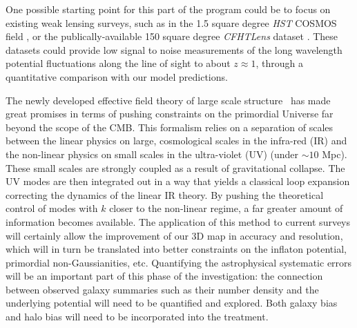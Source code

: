 \documentclass[psfig,12pt]{article}
\def\ni{\noindent}
\def\lo{\mathrel{\raise.3ex\hbox{$<$}\mkern-14mu\lower0.6ex\hbox{$\sim$}}}
\begin{document}
{One possible starting point for this part of the program could be to
focus on existing weak lensing surveys, such as in the 1.5 square degree
{\it HST} COSMOS field \cite{MasseyEtal2007}, or the
publically-available 150 square degree {\it CFHTLens} dataset
\cite{HeymansEtal2012}. These datasets could provide
low signal to noise measurements of the long wavelength potential
fluctuations along the line of sight to about $z \approx 1$,
through  a quantitative comparison with our model predictions.

\ni{\bf Further Constraints on Inflation:}
The newly developed effective field theory of large scale
structure~\cite{Carrasco2012} has made great promises in terms of
pushing constraints on the primordial Universe far beyond the scope of
the CMB. This formalism relies on a separation of scales between the
linear physics on large, cosmological scales in the infra-red (IR) and
the non-linear physics on small scales in the ultra-violet (UV) (under
$\sim10$ Mpc). These small scales are strongly coupled as a result of
gravitational collapse. The UV modes are then integrated out in a way
that yields a classical loop expansion correcting the dynamics of the
linear IR theory. By pushing the theoretical control of modes with $k$
closer to the non-linear regime, a far greater amount of information
becomes available. The application of this method to current
surveys will certainly allow the improvement of our 3D map in
accuracy and resolution, which will in turn be translated into better
constraints on the inflaton potential, primordial non-Gaussianities,
etc. Quantifying the astrophysical systematic errors will be an
important part of this phase of the investigation: the connection
between observed galaxy summaries such as their number density and the
underlying potential will need to be quantified and explored. Both
galaxy bias and halo bias will need to be incorporated into the
treatment.

%
%

}
\end{document}
